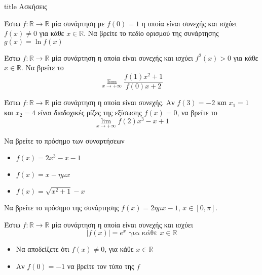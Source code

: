 \documentclass{presentation}
\begin{document}
\begin{frame}[noframenumbering]
  \vfill
  \centering
  \begin{beamercolorbox}[sep=8pt,center,shadow=true,rounded=true]{title}
    Ασκήσεις
  \end{beamercolorbox}
  \vfill
\end{frame}

\begin{askisi}
  Έστω $f:\mathbb{R}\to\mathbb{R}$ μία συνάρτηση με $f(0)=1$ η οποία είναι συνεχής και ισχύει $f(x)\ne 0$ για κάθε $x\in\mathbb{R}$. Να βρείτε το πεδίο ορισμού της συνάρτησης $g(x)=\ln f(x)$
\end{askisi}

\begin{askisi}
  Έστω $f:\mathbb{R}\to\mathbb{R}$ μία συνάρτηση η οποία είναι συνεχής και ισχύει $f^2(x)>0$ για κάθε $x\in\mathbb{R}$. Να βρείτε το
  $$\lim\limits_{x \to +\infty}{ \frac{f(1)x^2+1}{f(0)x+2} }$$
\end{askisi}

\begin{askisi}
  Έστω $f:\mathbb{R}\to\mathbb{R}$ μία συνάρτηση η οποία είναι συνεχής. Αν $f(3)=-2$ και $x_1=1$ και $x_2=4$ είναι διαδοχικές ρίζες της εξίσωσης $f(x)=0$, να βρείτε το
  $$\lim\limits_{x \to +\infty}{ f(2)x^3-x+1 }$$
\end{askisi}

\begin{askisi}
  Να βρείτε το πρόσημο των συναρτήσεων
  \begin{itemize}[<+->]
    \item $f(x)=2x^3-x-1$
    \item $f(x)=x-ημx$
    \item $f(x)=\sqrt{x^2+1}-x$
  \end{itemize}
\end{askisi}

\begin{askisi}
  Να βρείτε το πρόσημο της συνάρτησης $f(x)=2ημx-1$, $x\in [0,π]$.
\end{askisi}

\begin{askisi}
  Έστω $f:\mathbb{R}\to\mathbb{R}$ μία συνάρτηση η οποία είναι συνεχής και ισχύει
  $$|f(x)|=e^x \text{ για κάθε } x\in\mathbb{R}$$
  \begin{itemize}[<+->]
    \item Να αποδείξετε ότι $f(x)\ne 0$, για κάθε $x\in\mathbb{R}$
    \item Αν $f(0)=-1$ να βρείτε τον τύπο της $f$
  \end{itemize}
\end{askisi}
\end{document}
